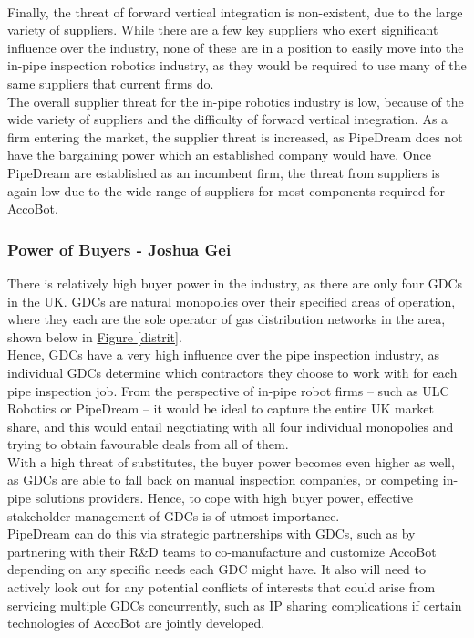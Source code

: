 \documentclass[11pt]{article}		%
\newcommand{\figref}[1]{\hyperref[#1]{Figure \ref*{#1}}}    %
\begin{document}
				\\
                \hspace*{3ex}Finally, the threat of forward vertical integration is non-existent, due to the large variety of suppliers.
				While there are a few key suppliers who exert significant influence over the industry, none of these are in a position to easily move into the in-pipe inspection robotics industry, as they would be required to use many of the same suppliers that current firms do.
				\\
                \hspace*{3ex}The overall supplier threat for the in-pipe robotics industry is low, because of the wide variety of suppliers and the difficulty of forward vertical integration.
				As a firm entering the market, the supplier threat is increased, as PipeDream does not have the bargaining power which an established company would have.
				Once PipeDream are established as an incumbent firm, the threat from suppliers is again low due to the wide range of suppliers for most components required for AccoBot.
				
		    \subsubsection{Power of Buyers - Joshua Gei}
			
    			There is relatively high buyer power in the industry, as there are only four GDCs in the UK. GDCs are natural monopolies over their specified areas of operation, where they each are the sole operator of gas distribution networks in the area, shown below in \figref{distrit}.
                \\
                \hspace*{3ex}Hence, GDCs have a very high influence over the pipe inspection industry, as individual GDCs determine which contractors they choose to work with for each pipe inspection job. From the perspective of in-pipe robot firms – such as ULC Robotics or PipeDream – it would be ideal to capture the entire UK market share, and this would entail negotiating with all four individual monopolies and trying to obtain favourable deals from all of them. 
                \\
                \hspace*{3ex}With a high threat of substitutes, the buyer power becomes even higher as well, as GDCs are able to fall back on manual inspection companies, or competing in-pipe solutions providers. Hence, to cope with high buyer power, effective stakeholder management of GDCs is of utmost importance.
                \\
                \hspace*{3ex}PipeDream can do this via strategic  partnerships with GDCs, such as by partnering with their R\&D teams to co-manufacture and customize AccoBot depending on any specific needs each GDC might have. It also will need to actively look out for any potential conflicts of interests that could arise from servicing multiple GDCs concurrently, such as IP sharing complications if certain technologies of AccoBot are jointly developed. 
				
\end{document}

